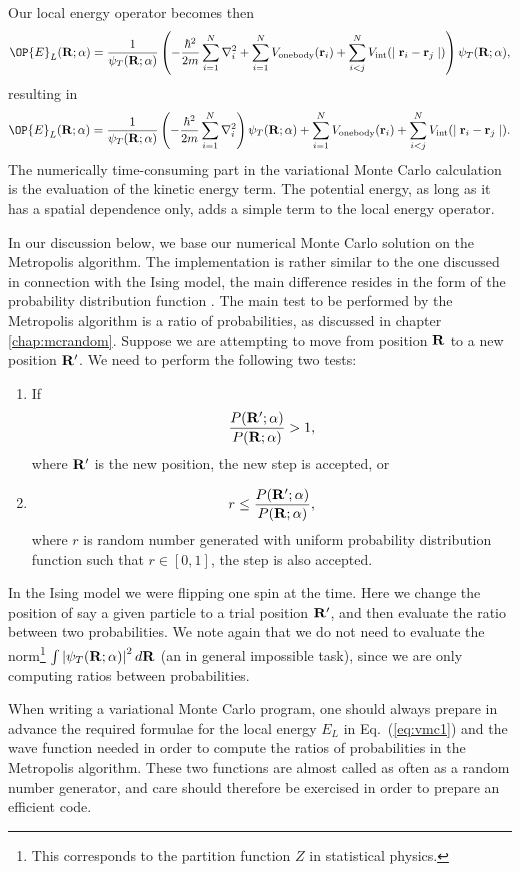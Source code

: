 Our local energy operator becomes then 
\[
   \OP{E}_L({\bf R};\alpha)=\frac{1}{\psi_T({\bf R};\alpha)}\left(- \frac {\hbar^2}{2m} \sum_{i=1}^N \nabla_i^2+ \sum_{i=1}^N 
V_{\mathrm{onebody}}({\bf r}_i) + \sum_{i<j}^N V_{\mathrm{int}}(\mid{\bf r}_i -{\bf r}_j \mid )\right)\psi_T({\bf R};\alpha),
\]
resulting in
\[
   \OP{E}_L({\bf R};\alpha)=\frac{1}{\psi_T({\bf R};\alpha)}\left(- \frac {\hbar^2}{2m} \sum_{i=1}^N \nabla_i^2\right)\psi_T({\bf R};\alpha) 
  + \sum_{i=1}^N V_{\mathrm{onebody}}({\bf r}_i) + \sum_{i<j}^N V_{\mathrm{int}}(\mid{\bf r}_i -{\bf r}_j \mid ).
\]
The numerically time-consuming part in the variational Monte Carlo calculation is the evaluation of the kinetic energy term.
The potential energy, as long as it has a spatial dependence only, adds  a simple term to the local energy operator.


In our discussion below, we base     
our numerical Monte Carlo solution on the Metropolis
algorithm. The implementation is rather similar to the
one discussed in connection with the Ising model, the main
difference resides in the form of the probability distribution function . The main test to be performed by the Metropolis algorithm is
a ratio of probabilities, as discussed in chapter \ref{chap:mcrandom}. 
Suppose we are attempting to move from 
position ${\bf R}$ to a new position ${\bf R'}$. We need to perform the following two tests:  
\begin{enumerate}
 \item If 
   \[ \frac{P({\bf R}';\alpha)}{P({\bf R};\alpha)} > 1, \]
    where ${\bf R}'$ is the new position, the new step is accepted, or
  \item 
       \[ r\le  \frac{P({\bf R}';\alpha)}{P({\bf R};\alpha)}, \]
  where $r$ is random number generated with uniform probability distribution function  such that
  $r\in [0,1]$, the step is also accepted.
\end{enumerate}
In the Ising model we were flipping one spin at the time. Here we change
the position of say a given particle to a trial position 
${\bf R}'$, and then evaluate the ratio between two probabilities.
We note again that we do not need to evaluate 
the norm\footnote{This corresponds to the  partition function 
$Z$ in statistical physics.} 
$\int \left|\psi_T({\bf R};\alpha)\right|^2d{\bf R}$ (an in general
impossible task), 
since we are only computing ratios between probabilities.

When writing a variational Monte Carlo program, one should always prepare in advance
the required formulae for the local energy $E_L$ 
in Eq.~(\ref{eq:vmc1}) 
and the wave function needed in order to compute the 
ratios of probabilities in the Metropolis algorithm.
These two functions are almost called as often as a random
number generator, and care should therefore be exercised 
in order to prepare an efficient code. 



